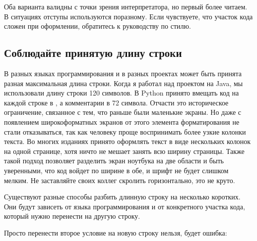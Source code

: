 \documentclass[letterpaper,10pt,russian]{sphinxmanual}
\begin{document}
\sphinxAtStartPar
Оба варианта валидны с точки зрения интерпретатора, но первый более читаем. В  ситуациях отступы используются по\sphinxhyphen{}разному. Если чувствуете, что участок кода сложен при оформлении, обратитесь к руководству по стилю.


\subsection{Соблюдайте принятую длину строки}
\label{\detokenize{educational_materials/styles/content:id3}}
\sphinxAtStartPar
В разных языках программирования и в разных проектах может быть принята разная максимальная длина строки. Когда я работал над проектом на Java, мы использовали длину строки 120 символов. В Python принято вмещать код на каждой строке в , а комментарии в 72 символа. Отчасти это историческое ограничение, связанное с тем, что раньше были маленькие экраны. Но даже с появлением широкоформатных экранов от этого элемента форматирования не стали отказываться, так как человеку проще воспринимать более узкие колонки текста. Во многих изданиях принято оформлять текст в виде нескольких колонок на одной странице, хотя ничто не мешает занять всю ширину страницы. Также такой подход позволяет разделить экран ноутбука на две области и быть уверенными, что код войдет по ширине в обе, и шрифт не будет слишком мелким. Не заставляйте своих коллег скролить горизонтально, это не круто.

\sphinxAtStartPar
Существуют разные способы разбить длинную строку на несколько коротких. Они будут зависеть от языка программирования и от конкретного участка кода, который нужно перенести на другую строку.

\begin{sphinxVerbatim}[commandchars=\\\{\}]
       
\end{sphinxVerbatim}

\sphinxAtStartPar
Просто перенести второе условие на новую строку нельзя, будет ошибка:
\end{document}
